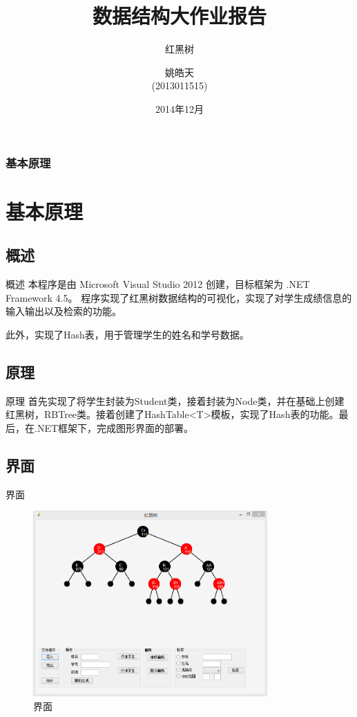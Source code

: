 \documentclass{beamer}
\begin{document}
\title{数据结构大作业报告}
\subtitle{红黑树}
\author{姚皓天\\(2013011515)}

\date{2014年12月}
\subject{数据结构}

\begin{frame} 
\titlepage 
\end{frame} 

\begin{frame}
\frametitle{基本原理}
\section{基本原理}
\subsection{概述}
\begin{block}{概述}
本程序是由 Microsoft Visual Studio 2012 创建，目标框架为 .NET Framework 4.5。
程序实现了红黑树数据结构的可视化，实现了对学生成绩信息的输入输出以及检索的功能。\par
此外，实现了Hash表，用于管理学生的姓名和学号数据。
\end{block}
\subsection{原理}
\begin{block}{原理}
首先实现了将学生封装为Student类，接着封装为Node类，并在基础上创建红黑树，RBTree类。接着创建了HashTable<T>模板，实现了Hash表的功能。最后，在.NET框架下，完成图形界面的部署。
\end{block}
\end{frame}

\begin{frame}
\subsection{界面}
\begin{block}{界面}
\begin{figure}[H]
\centering
\includegraphics[width=0.8\textwidth]{2.png}
\caption{界面} 
\end{figure}
\end{block}
\end{frame}
\end{document}
